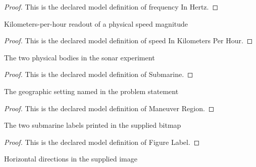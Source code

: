\begin{proof}
  This is the declared model definition of frequency In Hertz.
\end{proof}
\begin{definition}
  \label{def:physics:phyx-mini-0319:phyxminiproblems-problemphyxmini0319-speedinkilometersperhour}
  Kilometers-per-hour readout of a physical speed magnitude
\end{definition}
\begin{proof}
  This is the declared model definition of speed In Kilometers Per Hour.
\end{proof}
\begin{definition}[Submarine]
  \label{def:physics:phyx-mini-0319:phyxminiproblems-problemphyxmini0319-submarine}
  The two physical bodies in the sonar experiment
\end{definition}
\begin{proof}
  This is the declared model definition of Submarine.
\end{proof}
\begin{definition}
  \label{def:physics:phyx-mini-0319:phyxminiproblems-problemphyxmini0319-maneuverregion}
  The geographic setting named in the problem statement
\end{definition}
\begin{proof}
  This is the declared model definition of Maneuver Region.
\end{proof}
\begin{definition}
  \label{def:physics:phyx-mini-0319:phyxminiproblems-problemphyxmini0319-figurelabel}
  The two submarine labels printed in the supplied bitmap
\end{definition}
\begin{proof}
  This is the declared model definition of Figure Label.
\end{proof}
\begin{definition}
  \label{def:physics:phyx-mini-0319:phyxminiproblems-problemphyxmini0319-horizontaldirection}
  Horizontal directions in the supplied image
\end{definition}
